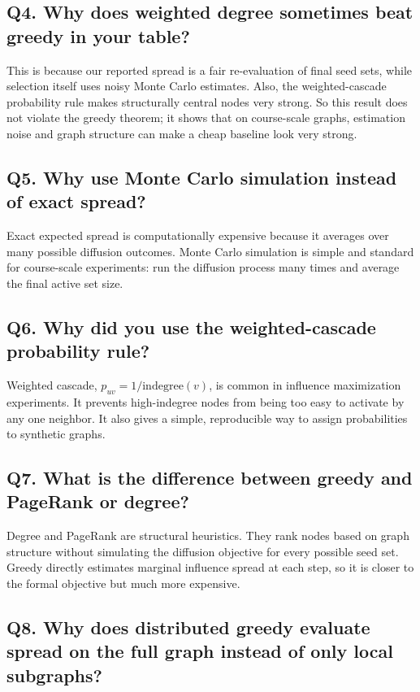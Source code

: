 \documentclass[10pt]{article}
\begin{document}
\subsection*{Q4. Why does weighted degree sometimes beat greedy in your table?}

This is because our reported spread is a fair re-evaluation of final seed
sets, while selection itself uses noisy Monte Carlo estimates. Also, the
weighted-cascade probability rule makes structurally central nodes very strong.
So this result does not violate the greedy theorem; it shows that on
course-scale graphs, estimation noise and graph structure can make a cheap
baseline look very strong.

\subsection*{Q5. Why use Monte Carlo simulation instead of exact spread?}

Exact expected spread is computationally expensive because it averages over
many possible diffusion outcomes. Monte Carlo simulation is simple and
standard for course-scale experiments: run the diffusion process many times
and average the final active set size.

\subsection*{Q6. Why did you use the weighted-cascade probability rule?}

Weighted cascade, \(p_{uv}=1/\mathrm{indegree}(v)\), is common in influence
maximization experiments. It prevents high-indegree nodes from being too easy
to activate by any one neighbor. It also gives a simple, reproducible way to
assign probabilities to synthetic graphs.

\subsection*{Q7. What is the difference between greedy and PageRank or degree?}

Degree and PageRank are structural heuristics. They rank nodes based on graph
structure without simulating the diffusion objective for every possible seed
set. Greedy directly estimates marginal influence spread at each step, so it
is closer to the formal objective but much more expensive.

\subsection*{Q8. Why does distributed greedy evaluate spread on the full graph
instead of only local subgraphs?}
\end{document}
